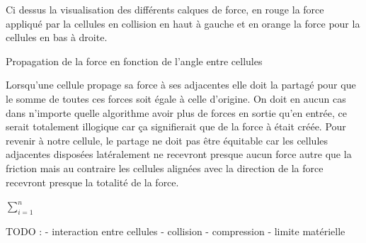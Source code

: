 \documentclass[a4paper,10pt]{article}
\begin{document}
Ci dessus la visualisation des différents calques de force, en rouge la force appliqué par la cellules en collision en haut à gauche et en orange la force pour la cellules en bas à droite.


	Propagation de la force en fonction de l'angle entre cellules

Lorsqu'une cellule propage sa force à ses adjacentes elle doit la partagé pour que le somme de toutes ces forces soit égale à celle d'origine. On doit en aucun cas dans n'importe quelle algorithme avoir plus de forces en sortie qu'en entrée, ce serait totalement illogique car ça signifierait que de la force à était créée. Pour revenir à notre cellule, le partage ne doit pas être équitable car les cellules adjacentes disposées latéralement ne recevront presque aucun force autre que la friction mais au contraire les cellules alignées avec la direction de la force recevront presque la totalité de la force.




$\sum_{i=1}^{n}$





TODO : 
- interaction entre cellules
- collision
- compression
- limite matérielle
\end{document}
